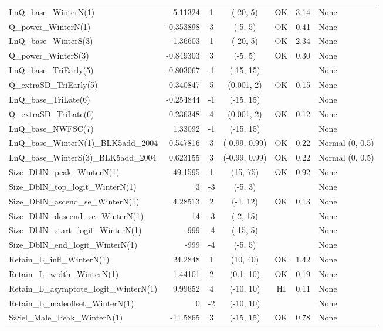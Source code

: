 \documentclass[12pt,]{article}
\begin{document}
\begin{landscape}
\begin{longtable}{lrcccll}
  LnQ\_base\_WinterN(1) & -5.11324 & 1 & (-20, 5) & OK & 3.14 & None \\ 
  Q\_power\_WinterN(1) & -0.353898 & 3 & (-5, 5) & OK & 0.41 & None \\ 
  LnQ\_base\_WinterS(3) & -1.36603 & 1 & (-20, 5) & OK & 2.34 & None \\ 
  Q\_power\_WinterS(3) & -0.849303 & 3 & (-5, 5) & OK & 0.30 & None \\ 
  LnQ\_base\_TriEarly(5) & -0.803067 & -1 & (-15, 15) &  &  & None \\ 
  Q\_extraSD\_TriEarly(5) & 0.340847 & 5 & (0.001, 2) & OK & 0.15 & None \\ 
  LnQ\_base\_TriLate(6) & -0.254844 & -1 & (-15, 15) &  &  & None \\ 
  Q\_extraSD\_TriLate(6) & 0.236348 & 4 & (0.001, 2) & OK & 0.12 & None \\ 
  LnQ\_base\_NWFSC(7) & 1.33092 & -1 & (-15, 15) &  &  & None \\ 
  LnQ\_base\_WinterN(1)\_BLK5add\_2004 & 0.547816 & 3 & (-0.99, 0.99) & OK & 0.22 & Normal (0, 0.5) \\ 
  LnQ\_base\_WinterS(3)\_BLK5add\_2004 & 0.623155 & 3 & (-0.99, 0.99) & OK & 0.22 & Normal (0, 0.5) \\ 
  Size\_DblN\_peak\_WinterN(1) & 49.1595 & 1 & (15, 75) & OK & 0.92 & None \\ 
  Size\_DblN\_top\_logit\_WinterN(1) & 3 & -3 & (-5, 3) &  &  & None \\ 
  Size\_DblN\_ascend\_se\_WinterN(1) & 4.28513 & 2 & (-4, 12) & OK & 0.13 & None \\ 
  Size\_DblN\_descend\_se\_WinterN(1) & 14 & -3 & (-2, 15) &  &  & None \\ 
  Size\_DblN\_start\_logit\_WinterN(1) & -999 & -4 & (-15, 5) &  &  & None \\ 
  Size\_DblN\_end\_logit\_WinterN(1) & -999 & -4 & (-5, 5) &  &  & None \\ 
  Retain\_L\_infl\_WinterN(1) & 24.2848 & 1 & (10, 40) & OK & 1.42 & None \\ 
  Retain\_L\_width\_WinterN(1) & 1.44101 & 2 & (0.1, 10) & OK & 0.19 & None \\ 
  Retain\_L\_asymptote\_logit\_WinterN(1) & 9.99652 & 4 & (-10, 10) & HI & 0.11 & None \\ 
  Retain\_L\_maleoffset\_WinterN(1) & 0 & -2 & (-10, 10) &  &  & None \\ 
  SzSel\_Male\_Peak\_WinterN(1) & -11.5865 & 3 & (-15, 15) & OK & 0.78 & None \\ 

\end{longtable}
\end{landscape}
\end{document}
